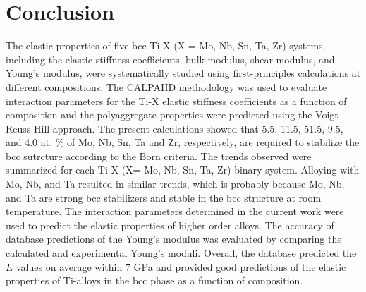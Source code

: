 \section{Conclusion}

The elastic properties of five bcc Ti-X (X = Mo, Nb, Sn, Ta, Zr) systems, including the elastic stiffness coefficients, bulk modulus, shear modulus, and Young's modulus, were systematically studied using first-principles calculations at different compositions. The CALPAHD methodology was used to evaluate interaction parameters for the Ti-X elastic stiffness coefficients as a function of composition and the polyaggregate properties were predicted using the Voigt-Reuss-Hill approach. The present calculations showed that 5.5, 11.5, 51.5, 9.5, and 4.0 at. \% of Mo, Nb, Sn, Ta and Zr, respectively, are required to stabilize the bcc sutrcture according to the Born criteria. The trends observed were summarized for each Ti-X (X= Mo, Nb, Sn, Ta, Zr) binary system. Alloying with Mo, Nb, and Ta resulted in similar trends, which is probably because Mo, Nb, and Ta are strong bcc stabilizers and stable in the bcc structure at room temperature. The interaction parameters determined in the current work were used to predict the elastic properties of higher order alloys. The accuracy of database predictions of the Young's modulus was evaluated by comparing the calculated and experimental Young's moduli. Overall, the database predicted the $E$ values on average within 7 GPa and provided good predictions of the elastic properties of Ti-alloys in the bcc phase as a function of composition. 

